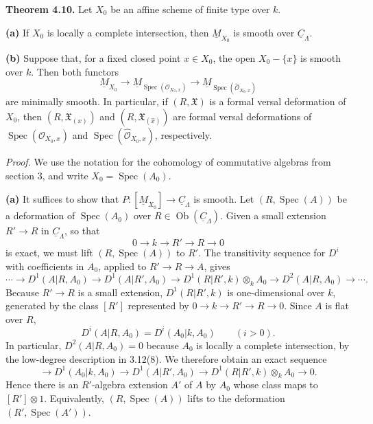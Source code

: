 
\medskip
\noindent\textbf{Theorem 4.10.}
Let $X_0$ be an affine scheme of finite type over $k$.

\smallskip
\noindent\textbf{(a)}
If $X_0$ is locally a complete intersection, then
$\underline M_{X_0}$ is smooth over $\underline C_\Lambda$.

\smallskip
\noindent\textbf{(b)}
Suppose that, for a fixed closed point $x\in X_0$, the open
$X_0-\{x\}$ is smooth over $k$. Then both functors
\[
\underline M_{X_0}
\longrightarrow
\underline M_{\operatorname{Spec}(\mathcal O_{X_0,x})}
\longrightarrow
\underline M_{\operatorname{Spec}(\widehat{\mathcal O}_{X_0,x})}
\]
are minimally smooth. In particular, if $(R,\mathfrak X)$ is a formal
versal deformation of $X_0$, then $(R,\mathfrak X_{(x)})$ and
$(R,\mathfrak X_{(\widehat x)})$ are formal versal deformations of
$\operatorname{Spec}(\mathcal O_{X_0,x})$ and
$\operatorname{Spec}(\widehat{\mathcal O}_{X_0,x})$, respectively.

\medskip
\noindent\textit{Proof.}
We use the notation for the cohomology of commutative algebras from
section 3, and write $X_0=\operatorname{Spec}(A_0)$.


\smallskip
\noindent\textbf{(a)}
It suffices to show that
$P:[\underline M_{X_0}]\longrightarrow\underline C_\Lambda$ is
smooth. Let $(R,\operatorname{Spec}(A))$ be a deformation of
$\operatorname{Spec}(A_0)$ over
$R\in\operatorname{Ob}(\underline C_\Lambda)$. Given a small
extension $R'\longrightarrow R$ in $\underline C_\Lambda$, so that
\[
0\longrightarrow k\longrightarrow R'\longrightarrow R
\longrightarrow0
\]
is exact, we must lift $(R,\operatorname{Spec}(A))$ to $R'$. The
transitivity sequence for $D^i$ with coefficients in $A_0$, applied
to $R'\longrightarrow R\longrightarrow A$, gives
\[
\cdots\longrightarrow D^1(A|R,A_0)
\longrightarrow D^1(A|R',A_0)
\longrightarrow D^1(R|R',k)\otimes_kA_0
\longrightarrow D^2(A|R,A_0)\longrightarrow\cdots .
\]
Because $R'\longrightarrow R$ is a small extension,
$D^1(R|R',k)$ is one-dimensional over $k$, generated by the class
$[R']$ represented by
$0\longrightarrow k\longrightarrow R'\longrightarrow R
\longrightarrow0$. Since $A$ is flat over $R$,
\[
D^i(A|R,A_0)=D^i(A_0|k,A_0)
\qquad(i>0).
\]
In particular, $D^2(A|R,A_0)=0$ because $A_0$ is locally a complete
intersection, by the low-degree description in 3.12(8). We therefore
obtain an exact sequence
\[
\longrightarrow D^1(A_0|k,A_0)
\longrightarrow D^1(A|R',A_0)
\longrightarrow D^1(R|R',k)\otimes_kA_0
\longrightarrow0.
\]
Hence there is an $R'$-algebra extension $A'$ of $A$ by $A_0$ whose
class maps to $[R']\otimes1$. Equivalently,
$(R,\operatorname{Spec}(A))$ lifts to the deformation
$(R',\operatorname{Spec}(A'))$.

